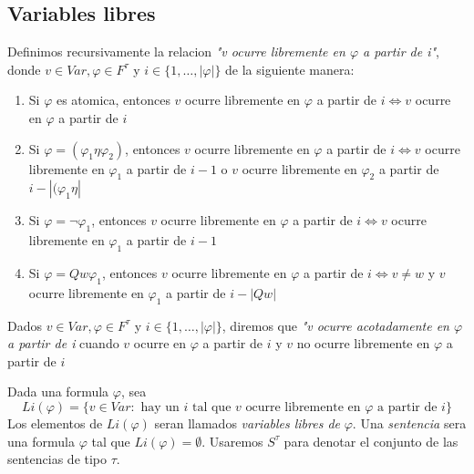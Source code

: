 
\subsection{Variables libres}
\begin{definition}
  Definimos recursivamente la relacion \emph{"v ocurre libremente en $\varphi$ a partir de i"},
  donde $v \in Var, \varphi \in F^\tau$ y $i \in \{1, \dots, |\varphi|\}$ de la siguiente manera:
  \begin{enumerate}
    \item Si $\varphi$ es atomica, entonces $v$ ocurre libremente en $\varphi$ a partir de $i \iff v$ ocurre en $\varphi$ a partir de $i$ 
    \item Si $\varphi = (\varphi_1\eta\varphi_2)$, entonces $v$ ocurre libremente en $\varphi$ a partir de $i \iff v$
      ocurre libremente en $\varphi_1$ a partir de $i - 1$ o $v$ ocurre libremente en $\varphi_2$ a partir de $i - |(\varphi_1\eta|$
    \item Si $\varphi = \neg\varphi_1$, entonces $v$ ocurre libremente en $\varphi$ a partir de $i \iff v$ ocurre libremente en $\varphi_1$ a partir de $i - 1$
    \item Si $\varphi = Qw\varphi_1$, entonces $v$ ocurre libremente en $\varphi$ a partir de $i \iff v \neq w$ y $v$ ocurre libremente en $\varphi_1$ a partir de $i - |Qw|$  
  \end{enumerate}

  Dados $v \in Var, \varphi \in F^\tau$ y $i \in \{1, \dots, |\varphi|\}$, diremos que \emph{"v ocurre acotadamente en $\varphi$
  a partir de i} cuando $v$ ocurre en $\varphi$ a partir de $i$ y $v$ no ocurre libremente en $\varphi$ a partir de $i$

\end{definition}

\begin{definition}
  Dada una formula $\varphi$, sea
  $$Li(\varphi) = \{v \in Var : \text{ hay un } i \text{ tal que } v \text{ ocurre libremente en } \varphi \text{ a partir de } i\}$$
  Los elementos de $Li(\varphi)$ seran llamados \emph{variables libres de} $\varphi$. Una \emph{sentencia} sera una formula
  $\varphi$ tal que $Li(\varphi) = \emptyset$. Usaremos $S^\tau$ para denotar el conjunto de las sentencias de tipo $\tau$.
\end{definition}

